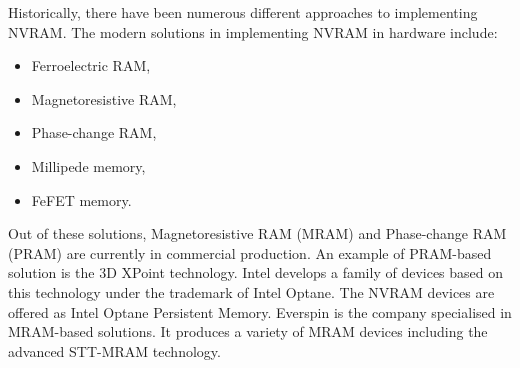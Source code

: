 \documentclass[thesis-en.tex]{subfiles}
\begin{document}
Historically, there have been numerous different approaches to implementing NVRAM. The modern solutions in implementing NVRAM in hardware include:
\begin{itemize}
\item Ferroelectric RAM,
\item Magnetoresistive RAM,
\item Phase-change RAM,
\item Millipede memory,
\item FeFET memory.
\end{itemize}
Out of these solutions, Magnetoresistive RAM (MRAM) and Phase-change RAM (PRAM) are currently in commercial production. An example of PRAM-based solution is the 3D XPoint technology. Intel develops a family of devices based on this technology under the trademark of Intel Optane. The NVRAM devices are offered as Intel Optane Persistent Memory. Everspin is the company specialised in MRAM-based solutions. It produces a variety of MRAM devices including the advanced STT-MRAM technology.


\bigskip
\end{document}
